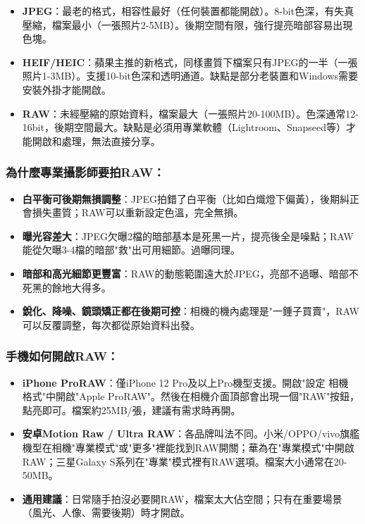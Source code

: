 \begin{itemize}
  \item \textbf{JPEG}：最老的格式，相容性最好（任何裝置都能開啟）。8-bit色深，有失真壓縮，檔案最小（一張照片2-5MB）。後期空間有限，強行提亮暗部容易出現色塊。
  \item \textbf{HEIF/HEIC}：蘋果主推的新格式，同樣畫質下檔案只有JPEG的一半（一張照片1-3MB）。支援10-bit色深和透明通道。缺點是部分老裝置和Windows需要安裝外掛才能開啟。
  \item \textbf{RAW}：未經壓縮的原始資料，檔案最大（一張照片20-100MB）。色深通常12-16bit，後期空間最大。缺點是必須用專業軟體（Lightroom、Snapseed等）才能開啟和處理，無法直接分享。
\end{itemize}

\subsubsection*{為什麼專業攝影師要拍RAW：}

\begin{itemize}
  \item \textbf{白平衡可後期無損調整}：JPEG拍錯了白平衡（比如白熾燈下偏黃），後期糾正會損失畫質；RAW可以重新設定色溫，完全無損。
  \item \textbf{曝光容差大}：JPEG欠曝2檔的暗部基本是死黑一片，提亮後全是噪點；RAW能從欠曝3-4檔的暗部"救"出可用細節。過曝同理。
  \item \textbf{暗部和高光細節更豐富}：RAW的動態範圍遠大於JPEG，亮部不過曝、暗部不死黑的餘地大得多。
  \item \textbf{銳化、降噪、鏡頭矯正都在後期可控}：相機的機內處理是"一錘子買賣"，RAW可以反覆調整，每次都從原始資料出發。
\end{itemize}

\subsubsection*{手機如何開啟RAW：}

\begin{itemize}
  \item \textbf{iPhone ProRAW}：僅iPhone 12 Pro及以上Pro機型支援。開啟"設定 相機 格式"中開啟"Apple ProRAW"。然後在相機介面頂部會出現一個"RAW"按鈕，點亮即可。檔案約25MB/張，建議有需求時再開。
  \item \textbf{安卓Motion Raw / Ultra RAW}：各品牌叫法不同。小米/OPPO/vivo旗艦機型在相機"專業模式"或"更多"裡能找到RAW開關；華為在"專業模式"中開啟RAW；三星Galaxy S系列在"專業"模式裡有RAW選項。檔案大小通常在20-50MB。
  \item \textbf{通用建議}：日常隨手拍沒必要開RAW，檔案太大佔空間；只有在重要場景（風光、人像、需要後期）時才開啟。
\end{itemize}

